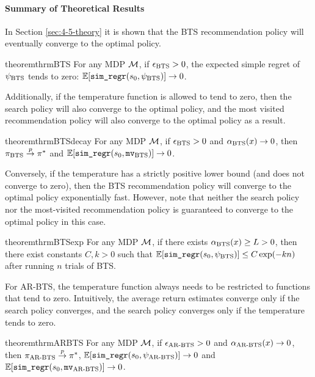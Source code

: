     
    \paragraph{Summary of Theoretical Results}

    In Section \ref{sec:4-5-theory} it is shown that the BTS recommendation policy will eventually converge to the optimal policy.
    \begin{restatable}{theorem}{thrmBTS} 
        \label{thrm:4:bts} 
        For any MDP $\mathcal{M}$, if ${\epsilon_{{\textnormal{BTS}}}} > 0$, the expected simple regret of ${\psi_{{\textnormal{BTS}}}}$ tends to zero: $\mathbb{E}[{\textnormal{\texttt{sim\_regr}}}(s_0,{\psi_{{\textnormal{BTS}}}})]\rightarrow 0$.
    \end{restatable}

    Additionally, if the temperature function is allowed to tend to zero, then the search policy will also converge to the optimal policy, and the most visited recommendation policy will also converge to the optimal policy as a result. 
    \begin{restatable}{theorem}{thrmBTSdecay} \label{thrm:4:bts_decay}
        For any MDP $\mathcal{M}$, if ${\epsilon_{{\textnormal{BTS}}}} > 0$ and ${\alpha_{{\textnormal{BTS}}}}(x)\rightarrow 0$, then ${\pi_{{\textnormal{BTS}}}}\overset{p}{\to} \pi^*$ and $\mathbb{E}[{\textnormal{\texttt{sim\_regr}}}(s_0,{\textup{\texttt{mv}}_{{\textnormal{BTS}}}})]\rightarrow 0$.
    \end{restatable}

    Conversely, if the temperature has a strictly positive lower bound (and does not converge to zero), then the BTS recommendation policy will converge to the optimal policy exponentially fast. However, note that neither the search policy nor the most-visited recommendation policy is guaranteed to converge to the optimal policy in this case.
    \begin{restatable}{theorem}{thrmBTSexp} \label{thrm:4:bts_exp}
        For any MDP $\mathcal{M}$, if there exists ${\alpha_{{\textnormal{BTS}}}}(x)\geq L > 0$, then there exist constants $C,k>0$ such that $\mathbb{E}[{\textnormal{\texttt{sim\_regr}}}(s_0,{\psi_{{\textnormal{BTS}}}})] \leq C\exp(-kn)$ after running $n$ trials of BTS.
    \end{restatable}

    For AR-BTS, the temperature function always needs to be restricted to functions that tend to zero. Intuitively, the average return estimates converge only if the search policy converges, and the search policy converges only if the temperature tends to zero.
    \begin{restatable}{theorem}{thrmARBTS} \label{thrm:4:ar_bts}
        For any MDP $\mathcal{M}$, if ${\epsilon_{{\textnormal{AR-BTS}}}} > 0$ and ${\alpha_{{\textnormal{AR-BTS}}}}(x)\rightarrow 0$, then ${\pi_{{\textnormal{AR-BTS}}}}\overset{p}{\to} \pi^*$, $\mathbb{E}[{\textnormal{\texttt{sim\_regr}}}(s_0,{\psi_{{\textnormal{AR-BTS}}}})]\rightarrow 0$ and  $\mathbb{E}[{\textnormal{\texttt{sim\_regr}}}(s_0,{\textup{\texttt{mv}}_{{\textnormal{AR-BTS}}}})]\rightarrow 0$.
    \end{restatable} 











